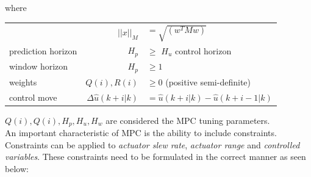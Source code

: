 where

\begin{center}
	\begin{tabular}{l r l }
		                   & $||x||_M$               & $= \sqrt{\left(w^TMw\right)}$         \\
		prediction horizon & $H_p$                   & $\ge$ $H_u$ control horizon           \\
		window horizon     & $H_p$                   & $\ge 1$                               \\
		weights            & $Q(i), R(i)$            & $\ge 0$ (positive semi-definite)      \\
		control move       & $\Delta \hat{u}(k+i|k)$ & $= \hat{u}(k+i|k) - \hat{u}(k+i-1|k)$
	\end{tabular}
\end{center}

$Q(i), Q(i), H_p, H_u, H_w$ are considered the MPC tuning parameters.\\

An important characteristic of MPC is the ability to include constraints. Constraints can be applied to \textit{actuator slew rate}, \textit{actuator range} and \textit{controlled variables}. These constraints need to be formulated in the correct manner as seen below:

